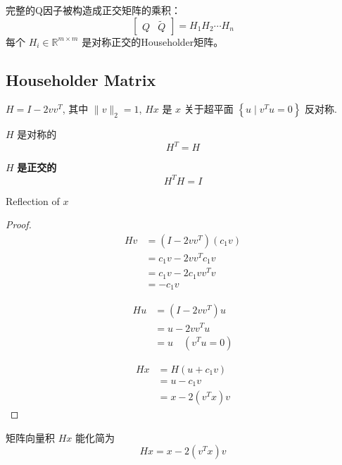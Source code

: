完整的Q因子被构造成正交矩阵的乘积：
$$
\left[\begin{array}{ll}
Q & \tilde{Q}
\end{array}\right]=H_{1} H_{2} \cdots H_{n}
$$
每个 $ H_{i} \in \mathbb{R}^{m \times m} $ 是对称正交的Householder矩阵。



\subsection{Householder Matrix}

\begin{theorem}
    $ H=I-2 v v^{T} $, 其中 $ \|v\|_{2}=1 $, $ H x $ 是 $ x $ 关于超平面 $ \left\{u \mid v^{T} u=0\right\} $ 反对称.

    $ H $ 是对称的 
    $$ H^{T}=H $$

$ H $ \textbf{是正交的}
$$ H^{T} H=I $$
\end{theorem}
    

\begin{FigureCenter}{Reflection of $x$}
    
\end{FigureCenter}



\begin{proof}
    $$\begin{aligned}
        Hv &= (I-2 v v^{T}) (c_1 v) \\
        &= c_1 v - 2 v v^T c_1 v \\
        & = c_1 v - 2 c_1 v v^T v \\
        & = -c_1 v
    \end{aligned}$$

    $$\begin{aligned}
        Hu &= (I - 2 v v^T) u \\
        &= u - 2 v v^T u \\
        & = u \quad (v^T u = 0) 
    \end{aligned}$$

    $$\begin{aligned}
        Hx &= H(u + c_1v) \\
        &= u - c_1 v \\
        &= x - 2(v^Tx)v
    \end{aligned}$$
\end{proof}

\begin{theorem}
    矩阵向量积 $ H x $ 能化简为
$$
H x=x-2\left(v^{T} x\right) v
$$
\end{theorem}


